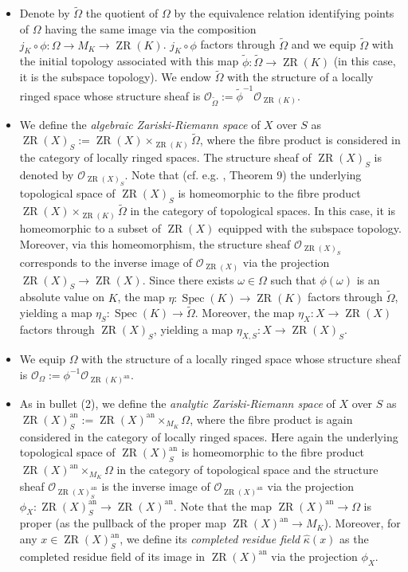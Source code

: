\documentclass [11pt,reqno]{amsart}
\newcommand{\1}{\mathmybb{1}}
\def\cO{{\mathcal{O}}}
\def\an{\operatorname{an}}
\def\Spec{\operatorname{Spec}}
\def\ZR{\operatorname{ZR}}
\def\tilde{\widetilde}
\begin{document}
\begin{definition}
\label{def:ZR_space_tac}
\begin{itemize}
	\item[(1)] Denote by $\tilde{\Omega}$ the quotient of $\Omega$ by the equivalence relation identifying points of $\Omega$ having the same image via the composition $j_{K}\circ \phi: \Omega\to M_{K}\to \ZR(K)$. $j_{K}\circ\phi$ factors through $\tilde{\Omega}$ and we equip $\tilde{\Omega}$ with the initial topology associated with this map $\tilde{\phi}:\tilde{\Omega}\to\ZR(K)$ (in this case, it is the subspace topology). We endow $\tilde{\Omega}$ with the structure of a locally ringed space whose structure sheaf is $\cO_{\tilde{\Omega}}:=\tilde{\phi}^{-1}\cO_{\ZR(K)}$.
	\item[(2)] We define the \emph{algebraic Zariski-Riemann space} of $X$ over $S$ as $\ZR(X)_{S}:=\ZR(X)\times_{\ZR(K)} \tilde{\Omega}$, where the fibre product is considered in the category of locally ringed spaces. The structure sheaf of $\ZR(X)_{S}$ is denoted by $\cO_{\ZR(X)_{S}}$. Note that (cf. e.g. \cite{Gillam11}, Theorem 9) the underlying topological space of $\ZR(X)_{S}$ is homeomorphic to the fibre product $\ZR(X)\times_{\ZR(K)}\tilde{\Omega}$ in the category of topological spaces. In this case, it is homeomorphic to a subset of $\ZR(X)$ equipped with the subspace topology. Moreover, via this homeomorphism, the structure sheaf $\cO_{\ZR(X)_{S}}$ corresponds to the inverse image of $\cO_{\ZR(X)}$ via the projection $\ZR(X)_{S}\to\ZR(X)$. Since there exists $\omega\in \Omega$ such that $\phi(\omega)$ is an absolute value on $K$, the map $\eta:\Spec(K) \to \ZR(K)$ factors through $\tilde{\Omega}$, yielding a map $\eta_{S}:\Spec(K) \to \tilde{\Omega}$. Moreover, the map $\eta_{X}:X \to \ZR(X)$ factors through $\ZR(X)_{S}$, yielding a map $\eta_{X,S}:X\to \ZR(X)_{S}$.
	\item[(3)] We equip $\Omega$ with the structure of a locally ringed space whose structure sheaf is $\cO_{\Omega}:=\phi^{-1}\cO_{\ZR(K)^{\an}}$. 	
	\item[(4)] As in bullet (2), we define the \emph{analytic Zariski-Riemann space} of $X$ over $S$ as $\ZR(X)^{\an}_{S}:=\ZR(X)^{\an}\times_{M_{K}} \Omega$, where the fibre product is again considered in the category of locally ringed spaces. Here again the underlying topological space of $\ZR(X)_{S}^{\an}$ is homeomorphic to the fibre product $\ZR(X)^{\an}\times_{M_{K}}\Omega$ in the category of topological space and the structure sheaf $\cO_{\ZR(X)_{S}^{\an}}$ is the inverse image of $\cO_{\ZR(X)^{\an}}$ via the projection $\phi_{X}:\ZR(X)_{S}^{\an}\to\ZR(X)^{\an}$. Note that the map $\ZR(X)^{\an}\to\Omega$ is proper (as the pullback of the proper map $\ZR(X)^{\an}\to M_{K}$). Moreover, for any $x\in \ZR(X)^{\an}_{S}$, we define its \emph{completed residue field} $\widehat{\kappa}(x)$ as the completed residue field of its image in $\ZR(X)^{\an}$ via the projection $\phi_{X}$.

\end{itemize}
\end{definition}
\end{document}
